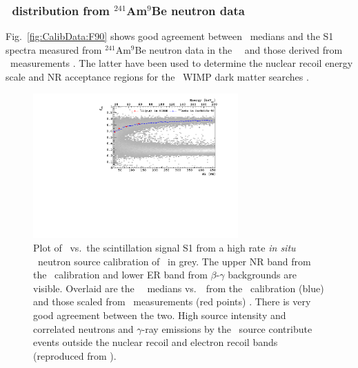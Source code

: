 \subsubsection{\FNinety\ distribution from $^{241}$Am$^9$Be neutron data}\label{sec:CalibData:NR}

Fig.~\ref{fig:CalibData:F90} shows good agreement between \FNinety\ medians and the S1 spectra measured from $^{241}$Am$^9$Be neutron data in the \dsf\ \tpc\ and those derived from \SCENE\ measurements \cite{Agnes:2015_uar}. The latter have been used to determine the nuclear recoil energy scale and NR acceptance regions for the \dsf\ WIMP dark matter searches \cite{Agnes:2015gu, Agnes:2015_uar}.
\begin{figure}[htbp]
\centering
\includegraphics[width=0.7\textwidth]{./Figures/DSf-UArAmBeDMSStCut.pdf}
\caption{Plot of \FNinety\ vs.~the scintillation signal S1 from a high rate {\it in situ} \AmBe\ neutron source calibration of \dsf\ in grey. The upper NR band from the \AmBe\ calibration and lower ER band from $\beta$-$\gamma$ backgrounds are visible. Overlaid are the \FNinety\ \NR\ medians vs.~\SOne\ from the \AmBe\ calibration (blue) and those scaled from \SCENE\ measurements (red points) \cite{Cao:2015ks}. There is very good agreement between the two.  High source intensity and correlated neutrons and $\gamma$-ray emissions by the \AmBe\ source contribute events outside the nuclear recoil and electron recoil bands (reproduced from \cite{Agnes:2015_uar}).\label{fig:CalibData:F90}\label{fig:DSf-UArAmBeDMS}} 
\end{figure}



